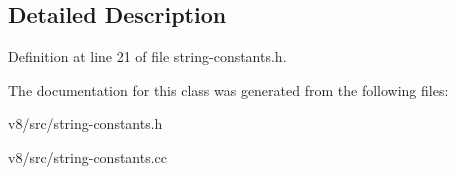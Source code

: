 \subsection{Detailed Description}


Definition at line 21 of file string-\/constants.\+h.



The documentation for this class was generated from the following files\+:\begin{DoxyCompactItemize}
\item 
v8/src/string-\/constants.\+h\item 
v8/src/string-\/constants.\+cc\end{DoxyCompactItemize}
